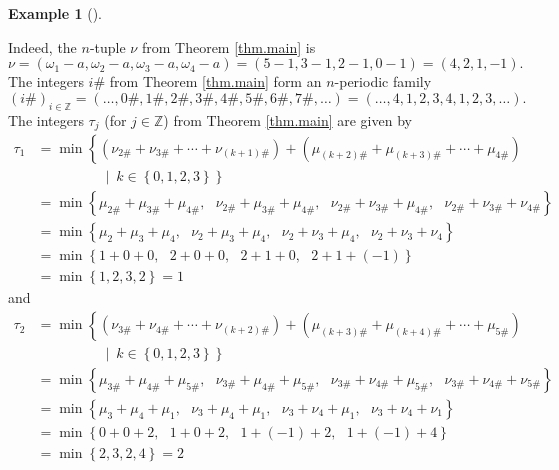 \documentclass[numbers=enddot,12pt,final,onecolumn,notitlepage]{scrartcl}%
\theoremstyle{definition}
\newtheorem{exam}[theo]{Example}
\newenvironment{example}[1][]
{\begin{exam}[#1]\begin{leftbar}}
{\end{leftbar}\end{exam}}
\begin{document}
\begin{example}
Indeed, the $n$-tuple $\nu$ from Theorem \ref{thm.main} is
\[
\nu=\left(  \omega_{1}-a,\omega_{2}-a,\omega_{3}-a,\omega_{4}-a\right)
=\left(  5-1,3-1,2-1,0-1\right)  =\left(  4,2,1,-1\right)  .
\]
The integers $i\#$ from Theorem \ref{thm.main} form an $n$-periodic family%
\[
\left(  i\#\right)  _{i\in\mathbb{Z}}=\left(  \ldots
,0\#,1\#,2\#,3\#,4\#,5\#,6\#,7\#,\ldots\right)  =\left(  \ldots
,4,1,2,3,4,1,2,3,\ldots\right)  .
\]
The integers $\tau_{j}$ (for $j\in\mathbb{Z}$) from Theorem \ref{thm.main} are
given by%
\begin{align*}
\tau_{1}  &  =\min\left\{  \left(  \nu_{2\#}+\nu_{3\#}+\cdots+\nu_{\left(
k+1\right)  \#}\right)  +\left(  \mu_{\left(  k+2\right)  \#}+\mu_{\left(
k+3\right)  \#}+\cdots+\mu_{4\#}\right)  \right. \\
&  \ \ \ \ \ \ \ \ \ \ \ \ \ \ \ \ \ \ \ \ \left.  \ \mid\ k\in\left\{
0,1,2,3\right\}  \right\} \\
&  =\min\left\{  \mu_{2\#}+\mu_{3\#}+\mu_{4\#},\ \ \ \nu_{2\#}+\mu_{3\#}%
+\mu_{4\#},\ \ \ \nu_{2\#}+\nu_{3\#}+\mu_{4\#},\ \ \ \nu_{2\#}+\nu_{3\#}%
+\nu_{4\#}\right\} \\
&  =\min\left\{  \mu_{2}+\mu_{3}+\mu_{4},\ \ \ \nu_{2}+\mu_{3}+\mu
_{4},\ \ \ \nu_{2}+\nu_{3}+\mu_{4},\ \ \ \nu_{2}+\nu_{3}+\nu_{4}\right\} \\
&  =\min\left\{  1+0+0,\ \ \ 2+0+0,\ \ \ 2+1+0,\ \ \ 2+1+\left(  -1\right)
\right\} \\
&  =\min\left\{  1,2,3,2\right\}  =1
\end{align*}
and%
\begin{align*}
\tau_{2}  &  =\min\left\{  \left(  \nu_{3\#}+\nu_{4\#}+\cdots+\nu_{\left(
k+2\right)  \#}\right)  +\left(  \mu_{\left(  k+3\right)  \#}+\mu_{\left(
k+4\right)  \#}+\cdots+\mu_{5\#}\right)  \right. \\
&  \ \ \ \ \ \ \ \ \ \ \ \ \ \ \ \ \ \ \ \ \left.  \ \mid\ k\in\left\{
0,1,2,3\right\}  \right\} \\
&  =\min\left\{  \mu_{3\#}+\mu_{4\#}+\mu_{5\#},\ \ \ \nu_{3\#}+\mu_{4\#}%
+\mu_{5\#},\ \ \ \nu_{3\#}+\nu_{4\#}+\mu_{5\#},\ \ \ \nu_{3\#}+\nu_{4\#}%
+\nu_{5\#}\right\} \\
&  =\min\left\{  \mu_{3}+\mu_{4}+\mu_{1},\ \ \ \nu_{3}+\mu_{4}+\mu
_{1},\ \ \ \nu_{3}+\nu_{4}+\mu_{1},\ \ \ \nu_{3}+\nu_{4}+\nu_{1}\right\} \\
&  =\min\left\{  0+0+2,\ \ \ 1+0+2,\ \ \ 1+\left(  -1\right)
+2,\ \ \ 1+\left(  -1\right)  +4\right\} \\
&  =\min\left\{  2,3,2,4\right\}  =2
\end{align*}

\end{example}
\end{document}
